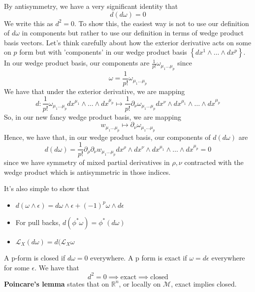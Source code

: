 \documentclass[11pt, a4paper]{article}   	%
\theoremstyle{slplain}
\begin{document}
By antisymmetry,  we have a very significant identity that 
\[
d ( d \omega  ) = 0 
\] We write this as $ d^ 2 = 0 $.
To show this, the easiest way is not to use our 
definition of $ d \omega  $ in components but 
rather to use our definition in terms of wedge product 
basis vectors. Let's think carefully about how the exterior 
derivative acts on some on $ p $ form but with 'components' 
in our wedge product basis $ \left\{  dx^1 \wedge  \dots \wedge  dx^p \right\}  $. 
In our wedge product basis, our components are $ \frac{1}{p !} \omega_{ \mu_ 1 \dots \mu _{ p } } $ since 
\[
	\omega = \frac{1}{p!} \omega_{ \mu_1 \dots \mu_{ p } }
\] We have that under the exterior derivative, we are mapping 
\[
 d : \frac{1}{p!} \omega_{ \mu_ 1 \dots \mu_ p } dx^{ \mu _ 1 } \wedge  \dots \wedge dx ^{ \mu_ p } \mapsto \frac{1}{p!} \partial_\nu \omega_{ \mu _1 \dots \mu _ p } dx^ \nu \wedge dx^{ \mu _ 1 } \wedge  \dots \wedge  dx^{ \mu _ p } 
\] So, in our new fancy wedge product basis, we are mapping 
 \[
 w_{ \mu_1 \dots \mu_{ p }} \mapsto \partial _ \nu \omega_{ \mu _ 1 \dots \mu _{ p } }
\] 
Hence, we have that, in our wedge product basis, our components of 
$ d ( d \omega ) $ are 
\[
d ( d \omega ) = \frac{1}{p ! } \partial _ \rho \partial  _ \nu w_{ \mu _ 1 \dots \mu _ p } dx^ \rho \wedge  dx ^ \nu \wedge  dx ^{ \mu _ 1 } \wedge  \dots \wedge  dx^{\mu _ p } = 0 
\] since we have symmetry of mixed 
partial derivatives in $ \rho , \nu $ contracted 
with the wedge product which is antisymmetric in those 
indices.

It's also simple to show that 
\begin{itemize}
\item $ d ( \omega  \wedge \epsilon ) = d \omega  \wedge  \epsilon + ( - 1)^ p \omega  \wedge  d \epsilon $
\item For pull backs, $ d ( \phi^ * \omega  ) = \phi^* ( d \omega  ) $
\item $ \mathcal{ L }_X ( d \omega  ) = d ( \mathcal{ L }_ X \omega $
\end{itemize}
A p-form is closed if $ d \omega   = 0 $ everywhere. 
A p form is exact if $ \omega   = d \epsilon$ everywhere for some $ \epsilon$. 
We have that  
\[
d^ 2 = 0 \implies \text{exact} \implies \text{closed} 
\] 
\textbf{Poincare's lemma} states that on $ \mathbb{ R}^n$, or locally on  $ \mathcal{  M }$, exact implies closed. 

\pagebreak 
\end{document}
